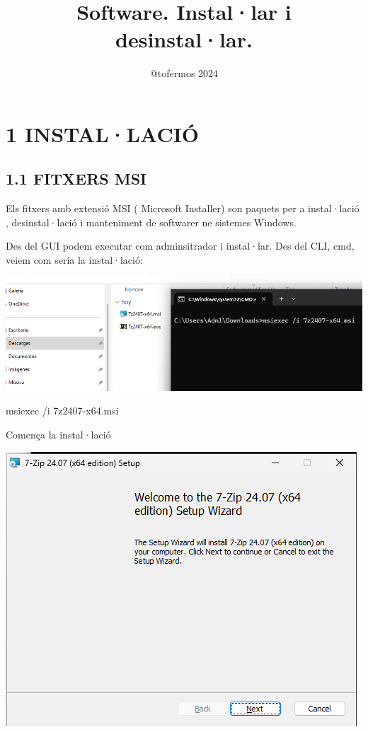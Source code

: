 \documentclass[
  a4paper,
]{article}
\title{Software. Instal·lar i desinstal·lar.}
\author{@tofermos 2024}
\date{}
\newenvironment{Shaded}{\begin{snugshade}}{\end{snugshade}}
\newcommand{\AttributeTok}[1]{\textcolor[rgb]{0.13,0.29,0.53}{#1}}
\newcommand{\NormalTok}[1]{#1}
\begin{document}
\maketitle

{
\setcounter{tocdepth}{2}
\tableofcontents
}
\newpage

\renewcommand\tablename{Tabla}

\section{1 INSTAL·LACIÓ}\label{installaciuxf3}

\subsection{1.1 FITXERS MSI}\label{fitxers-msi}

Els fitxers amb extensió MSI ( Microsoft Installer) son paquets per a
instal·lació , desinstal·lació i manteniment de softwarer ne sistemes
Windows.

Des del GUI podem executar com adminsitrador i instal·lar. Des del CLI,
cmd, veiem com sería la instal·lació:

\includegraphics{png/instalarMSIcmd.png}

\begin{Shaded}
\begin{Highlighting}[]
\NormalTok{msiexec }\AttributeTok{/i}\NormalTok{ 7z2407}\AttributeTok{{-}x64}\NormalTok{.msi}
\end{Highlighting}
\end{Shaded}

Comença la instal·lació

\includegraphics{png/instalarMSIcmd1.png}
\end{document}
